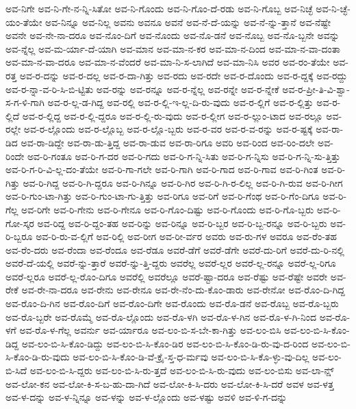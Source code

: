 {ಅವ-ನಿಗೇ
ಅವ-ನಿ-ಗೇ-ನ-ನ್ನಿ-ಸಿತೋ
ಅವ-ನಿ-ಗೊಂದು
ಅವ-ನಿ-ಗೊಂ-ದೆ-ರಡು
ಅವ-ನಿ-ಗೊಬ್ಬ
ಅವ-ನಿಚ್ಛೆ
ಅವ-ನಿ-ಚ್ಛೆ-ಯಂ-ತೆಯೇ
ಅವ-ನಿನ್ನೂ
ಅವ-ನಿಲ್ಲ
ಅವನು
ಅವನೂ
ಅವನೆ
ಅವ-ನೆ-ದೆ-ಯನ್ನು
ಅವ-ನೆ-ನ್ನು-ತ್ತಾನೆ
ಅವ-ನೆಷ್ಟೇ
ಅವನೇ
ಅವ-ನೇ-ನಾ-ದರೂ
ಅವ-ನೊಂ-ದಿಗೆ
ಅವ-ನೊಂದು
ಅವ-ನೊ-ಡನೆ
ಅವ-ನೊಬ್ಬ
ಅವ-ನೊ-ಬ್ಬನೇ
ಅವನ್ನು
ಅವ-ನ್ನೆಲ್ಲ
ಅವ-ಮ-ರ್ಯಾ-ದೆ-ಯಾಗಿ
ಅವ-ಮಾನ
ಅವ-ಮಾ-ನ-ಕರ
ಅವ-ಮಾ-ನ-ದಿಂದ
ಅವ-ಮಾ-ನ-ವಾ-ದಂತಾ
ಅವ-ಮಾ-ನ-ವಾ-ದರೂ
ಅವ-ಮಾ-ನ-ವೆಂದರೆ
ಅವ-ಮಾ-ನಿ-ಸ-ಲಾಗಿದೆ
ಅವ-ಮಾ-ನಿಸಿ
ಅವರ
ಅವ-ರಂ-ತೆಯೇ
ಅವ-ರತ್ತ
ಅವ-ರ-ದನ್ನು
ಅವ-ರ-ದಲ್ಲ
ಅವ-ರ-ದಾ-ಗಿತ್ತು
ಅವ-ರದು
ಅವ-ರದೇ
ಅವ-ರ-ದೊಂದು
ಅವ-ರ-ದ್ದಕ್ಕೆ
ಅವ-ರದ್ದು
ಅವ-ರ-ನ್ನಾ-ವ-ರಿ-ಸಿ-ಬಿ-ಟ್ಟಿತು
ಅವ-ರನ್ನು
ಅವ-ರನ್ನೂ
ಅವ-ರ-ನ್ನೆಲ್ಲ
ಅವ-ರನ್ನೇ
ಅವ-ರ-ನ್ನೇಕೆ
ಅವ-ರ-ಪ್ರೀ-ತಿ-ವಿ-ಶ್ವಾ-ಸ-ಗ-ಳಿ-ಗಾಗಿ
ಅವ-ರ-ಲ್ಲ-ಡ-ಗಿದ್ದ
ಅವ-ರಲ್ಲಿ
ಅವ-ರ-ಲ್ಲಿ-ಇ-ಲ್ಲ-ದಿ-ರು-ವುದು
ಅವ-ರ-ಲ್ಲಿಗೆ
ಅವ-ರ-ಲ್ಲಿತ್ತು
ಅವ-ರ-ಲ್ಲಿದೆ
ಅವ-ರ-ಲ್ಲಿದ್ದ
ಅವ-ರ-ಲ್ಲಿ-ದ್ದರೂ
ಅವ-ರ-ಲ್ಲಿ-ರು-ವುದು
ಅವ-ರ-ಲ್ಲೀಗ
ಅವ-ರ-ಲ್ಲುಂ-ಟಾದ
ಅವ-ರಲ್ಲೂ
ಅವ-ರಲ್ಲೇ
ಅವ-ರ-ಲ್ಲೊಂದು
ಅವ-ರ-ಲ್ಲೊಬ್ಬ
ಅವ-ರ-ಲ್ಲೊ-ಬ್ಬರು
ಅವ-ರ-ವರ
ಅವ-ರ-ವ-ರನ್ನು
ಅವ-ರ-ಷ್ಟಕ್ಕೆ
ಅವ-ರಾ-ಡಿದ
ಅವ-ರಾ-ಡಿದ್ದೇ
ಅವ-ರಾ-ಡು-ತ್ತಿದ್ದ
ಅವ-ರಾ-ಡುವ
ಅವ-ರಾ-ರಿಗೂ
ಅವರಿ
ಅವ-ರಿಂದ
ಅವ-ರಿಂ-ದಲೇ
ಅವ-ರಿಂದೇ
ಅವ-ರಿ-ಗಂತೂ
ಅವ-ರಿ-ಗ-ದರ
ಅವ-ರಿ-ಗದು
ಅವ-ರಿ-ಗ-ನ್ನಿ-ಸಿತು
ಅವ-ರಿ-ಗ-ನ್ನಿಸು
ಅವ-ರಿ-ಗ-ನ್ನಿ-ಸು-ತ್ತಿತ್ತು
ಅವ-ರಿ-ಗ-ರಿ-ವಿ-ಲ್ಲ-ದಂ-ತೆಯೇ
ಅವ-ರಿ-ಗಾ-ಗಲೇ
ಅವ-ರಿ-ಗಾಗಿ
ಅವ-ರಿ-ಗಾದ
ಅವ-ರಿ-ಗಾವ
ಅವ-ರಿ-ಗಿಂತ
ಅವ-ರಿ-ಗಿತ್ತು
ಅವ-ರಿ-ಗಿದ್ದ
ಅವ-ರಿ-ಗಿ-ದ್ದರೂ
ಅವ-ರಿ-ಗಿನ್ನೂ
ಅವ-ರಿ-ಗಿರ
ಅವ-ರಿ-ಗಿ-ರ-ಲಿಲ್ಲ
ಅವ-ರಿ-ಗಿ-ರುವ
ಅವ-ರಿ-ಗೀಗ
ಅವ-ರಿ-ಗುಂ-ಟಾ-ಗಿತ್ತು
ಅವ-ರಿ-ಗುಂ-ಟಾ-ಗು-ತ್ತಿತ್ತು
ಅವ-ರಿಗೂ
ಅವ-ರಿಗೆ
ಅವ-ರಿ-ಗೆಂಥ
ಅವ-ರಿ-ಗೆಂ-ದಿಗೂ
ಅವ-ರಿ-ಗೆಲ್ಲ
ಅವ-ರಿಗೇ
ಅವ-ರಿ-ಗೇನು
ಅವ-ರಿ-ಗೇನೂ
ಅವ-ರಿ-ಗೊಂ-ದಿಷ್ಟು
ಅವ-ರಿ-ಗೊಂದು
ಅವ-ರಿ-ಗೊ-ಬ್ಬರು
ಅವ-ರಿ-ಗೋ-ಸ್ಕರ
ಅವ-ರಿದ್ದ
ಅವ-ರಿ-ದ್ದಂ-ತಹ
ಅವ-ರಿನ್ನು
ಅವ-ರಿನ್ನೂ
ಅವ-ರಿ-ಬ್ಬರ
ಅವ-ರಿ-ಬ್ಬ-ರನ್ನೂ
ಅವ-ರಿ-ಬ್ಬರು
ಅವ-ರಿ-ಬ್ಬರೂ
ಅವ-ರಿ-ರು-ವ-ಲ್ಲಿಗೆ
ಅವ-ರಿಲ್ಲಿ
ಅವ-ರೀಗ
ಅವ-ರೀ-ರ್ವರ
ಅವರು
ಅವ-ರು-ಗಳ
ಅವರೂ
ಅವ-ರೆಂ-ತಹ
ಅವ-ರೆಂ-ದರು
ಅವ-ರೆಂದಾ
ಅವ-ರೆಂದೂ
ಅವ-ರೆಡೂ
ಅವರೆ-ಡೆಗೆ
ಅವರೆ-ಡೆಗೇ
ಅವರೆ-ದು-ರಿಗೆ
ಅವರೆ-ದು-ರಿ-ನಲ್ಲಿ
ಅವರೆ-ದೆ-ಯಲ್ಲಿ
ಅವರೆ-ನ್ನು-ತ್ತಾರೆ
ಅವರೆ-ನ್ನು-ತ್ತಿ-ದ್ದರು
ಅವರೆಲ್ಲ
ಅವರೆ-ಲ್ಲರ
ಅವರೆ-ಲ್ಲ-ರನ್ನೂ
ಅವರೆ-ಲ್ಲ-ರಿಗೂ
ಅವರೆ-ಲ್ಲರೂ
ಅವರೆ-ಲ್ಲ-ರೊಂ-ದಿಗೂ
ಅವರೆಲ್ಲಿ
ಅವರೆಲ್ಲೂ
ಅವರೆ-ಷ್ಟಾ-ದರೂ
ಅವ-ರೆಷ್ಟು
ಅವ-ರೆಷ್ಟೇ
ಅವರೇ
ಅವ-ರೇಕೆ
ಅವ-ರೇ-ನಾ-ದರೂ
ಅವ-ರೇನು
ಅವ-ರೇನೂ
ಅವ-ರೇ-ನೆಂ-ದು-ಕೊಂ-ಡಾರು
ಅವ-ರೇನೋ
ಅವ-ರೊಂ-ದಿ-ಗಿದ್ದ
ಅವ-ರೊಂ-ದಿ-ಗಿನ
ಅವ-ರೊಂ-ದಿಗೆ
ಅವ-ರೊಂ-ದಿಗೇ
ಅವ-ರೊಂದು
ಅವ-ರೊ-ಡನೆ
ಅವ-ರೊಬ್ಬ
ಅವ-ರೊ-ಬ್ಬರು
ಅವ-ರೊ-ಬ್ಬರೇ
ಅವ-ರೊಮ್ಮೆ
ಅವ-ರೊ-ಲ್ಲೊಂದು
ಅವ-ರೊ-ಳಗಿ
ಅವ-ರೊ-ಳ-ಗಿನ
ಅವ-ರೊ-ಳ-ಗಿ-ನಿಂದ
ಅವ-ರೊ-ಳಗೆ
ಅವ-ರೊ-ಳ-ಗೆಲ್ಲ
ಅವರ್ನು
ಅವ-ರ್ಯಾರೂ
ಅವ-ಲಂ-ಬಿ-ಸ-ಬೇ-ಕಾ-ಗಿತ್ತು
ಅವ-ಲಂ-ಬಿಸಿ
ಅವ-ಲಂ-ಬಿ-ಸಿ-ಕೊಂ-ಡಿದ್ದ
ಅವ-ಲಂ-ಬಿ-ಸಿ-ಕೊಂ-ಡಿದ್ದು
ಅವ-ಲಂ-ಬಿ-ಸಿ-ಕೊಂ-ಡಿರ
ಅವ-ಲಂ-ಬಿ-ಸಿ-ಕೊಂ-ಡಿ-ರು-ವು-ದ-ರಿಂದ
ಅವ-ಲಂ-ಬಿ-ಸಿ-ಕೊಂ-ಡಿ-ರು-ವುದು
ಅವ-ಲಂ-ಬಿ-ಸಿ-ಕೊಂ-ಡಿ-ವೆ-ಕ್ರೈ-ಸ್ತ-ಧ-ರ್ಮವು
ಅವ-ಲಂ-ಬಿ-ಸಿ-ಕೊ-ಳ್ಳು-ವು-ದಿಲ್ಲ
ಅವ-ಲಂ-ಬಿ-ಸಿದೆ
ಅವ-ಲಂ-ಬಿ-ಸಿ-ದ್ದರು
ಅವ-ಲಂ-ಬಿ-ಸಿ-ರು-ತ್ತದೆ
ಅವ-ಲಂ-ಬಿ-ಸಿ-ರು-ವುದು
ಅವ-ಲಂ-ಬಿಸು
ಅವ-ಲಾ-ನ್ಷ್
ಅವ-ಲೋ-ಕನ
ಅವ-ಲೋ-ಕಿ-ಸ-ಬ-ಹು-ದಾ-ಗಿದೆ
ಅವ-ಲೋ-ಕಿ-ಸಿ-ದರು
ಅವ-ಲೋ-ಕಿ-ಸಿ-ದರೆ
ಅವಳ
ಅವ-ಳತ್ತ
ಅವ-ಳ-ದನ್ನು
ಅವ-ಳ-ನ್ನಿನ್ನೂ
ಅವ-ಳನ್ನು
ಅವ-ಳ-ಲ್ಲೊಂದು
ಅವ-ಳಷ್ಟು
ಅವಳಿ
ಅವ-ಳಿ-ಗ-ದನ್ನು
}
